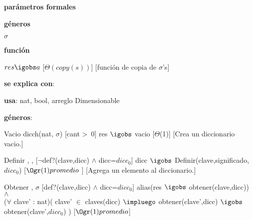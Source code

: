 \begin{Interfaz}

	\textbf{parámetros formales}\parindent\\
	\parbox{1.7cm}{\textbf{géneros}} $\sigma$\\
	\parbox[t]{1.7cm}{\textbf{función}}\parbox[t]{\textwidth-2\parindent-1.7cm}{%
	    	{$res \igobs a$}
		[$\Theta(copy(s))$]
		[función de copia de $\sigma$'s]
	}
	
	\textbf{se explica con}: 
	
	\textbf{usa}: nat, bool, arreglo Dimensionable
	
	\textbf{géneros}: 
	
	
	\InterfazFuncion
	{Vacio}
	{}
	{dicch(nat, $\sigma$)}
	[cant >\ 0]
	{res $\igobs$ vacio}
	[$\Theta$(1)]
	[Crea un diccionario vacio.]
	
	\InterfazFuncion
	{Definir}
	{, , }
	{}
	[$\neg$def?(clave,dicc) $\land$ dicc=$dicc_0$]
	{dicc $\igobs$ Definir(clave,significado,$dicc_0$)}
	[$\Ogr(1) promedio$ ]
	[Agrega un elemento al diccionario.]	
	
	\InterfazFuncion
	{Obtener}
	{, }
	{$\sigma$}
	[def?(clave,dicc) $\land$ dicc=$dicc_0$]
	{alias(res $\igobs$ obtener(clave,dicc)) 
		$\land$\\ ($\forall$ clave' : nat)( clave' $\in$ claves(dicc) $\impluego$ obtener(clave',dicc) $\igobs$ obtener(clave',$dicc_0$) )}
	[$\Ogr(1) promedio$]
	
\end{Interfaz}

